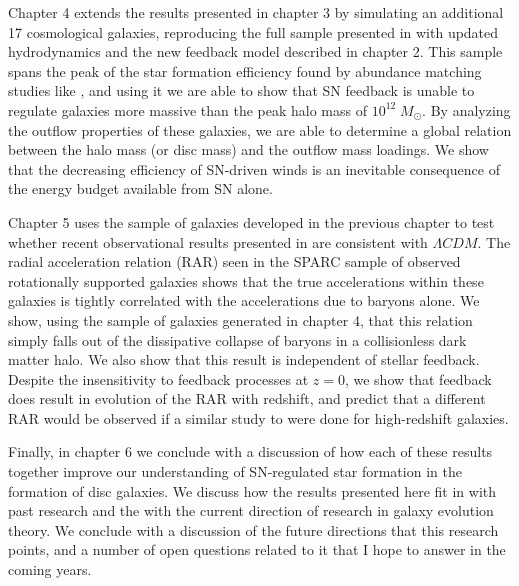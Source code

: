 Chapter 4 extends the results presented in chapter 3 by simulating an additional
17 cosmological galaxies, reproducing the full sample presented in
\citet{Stinson2010} with updated hydrodynamics and the new feedback model
described in chapter 2.  This sample spans the peak of the star formation
efficiency found by abundance matching studies like \citet{Moster2013}, and
using it we are able to show that SN feedback is unable to regulate
galaxies more massive than the peak halo mass of $10^{12}\;M_\odot$.  By
analyzing the outflow properties of these galaxies, we are able to determine a
global relation between the halo mass (or disc mass) and the outflow mass
loadings.  We show that the decreasing efficiency of SN-driven winds is an
inevitable consequence of the energy budget available from SN alone.

Chapter 5 uses the sample of galaxies developed in the previous chapter to
test whether recent observational results presented in \citet{McGaugh2016}
are consistent with $\Lambda CDM$.  The radial acceleration relation (RAR) seen in
the SPARC sample \citep{Lelli2016} of observed rotationally supported galaxies
shows that the true accelerations within these galaxies is tightly correlated 
with the accelerations due to baryons alone.  We show, using the sample of
galaxies generated in chapter 4, that this relation simply falls out of the
dissipative collapse of baryons in a collisionless dark matter halo.  We also
show that this result is independent of stellar feedback.  Despite the insensitivity
to feedback processes at $z=0$, we show that feedback does result in evolution
of the RAR with redshift, and predict that a different RAR would be observed if
a similar study to \citep{Lelli2016} were done for high-redshift galaxies.

Finally, in chapter 6 we conclude with a discussion of how each of these results
together improve our understanding of SN-regulated star formation
in the formation of disc galaxies.  We discuss how the results presented here
fit in with past research and the with the current direction of research in
galaxy evolution theory.  We conclude with a discussion of the future directions
that this research points, and a number of open questions related to it that I
hope to answer in the coming years.



